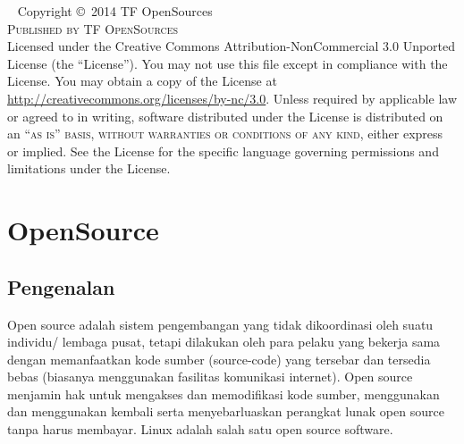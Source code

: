 \documentclass[11pt,fleqn]{book} %
\begin{document}
\newpage
~\vfill
\thispagestyle{empty}
\noindent Copyright \copyright\ 2014 TF OpenSources\\ %
\noindent \textsc{Published by TF OpenSources}\\ %
\noindent Licensed under the Creative Commons Attribution-NonCommercial 3.0 Unported License (the ``License''). You may not use this file except in compliance with the License. You may obtain a copy of the License at \url{http://creativecommons.org/licenses/by-nc/3.0}. Unless required by applicable law or agreed to in writing, software distributed under the License is distributed on an \textsc{``as is'' basis, without warranties or conditions of any kind}, either express or implied. See the License for the specific language governing permissions and limitations under the License.\\ %

\newpage
{} %
\pagestyle{empty} %
\tableofcontents %
\cleardoublepage %
\pagestyle{fancy} %

\newpage
{} %
\chapter{OpenSource}
\section{Pengenalan}
\begin{justified}
 \hspace{10pt} Open source adalah sistem pengembangan yang tidak dikoordinasi oleh suatu individu/ lembaga pusat, tetapi dilakukan oleh para pelaku yang bekerja sama dengan memanfaatkan kode sumber (source-code) yang tersebar dan tersedia bebas (biasanya menggunakan fasilitas komunikasi internet). 
 Open source menjamin hak untuk mengakses dan memodifikasi kode sumber, menggunakan dan menggunakan kembali serta menyebarluaskan perangkat lunak open source  tanpa harus membayar. 
 Linux adalah salah satu open source software.
\end{justified}
\end{document}
